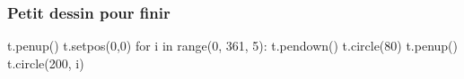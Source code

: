 \documentclass{beamer}
\begin{document}
\begin{frame}
   \frametitle{Petit dessin pour finir}

   \begin{pyverbatim}
      t.penup()
      t.setpos(0,0)
      for i in range(0, 361, 5):
         t.pendown()
         t.circle(80)
         t.penup()
         t.circle(200, i)
   \end{pyverbatim}
\end{frame}
%
%
%
%
\end{document}
